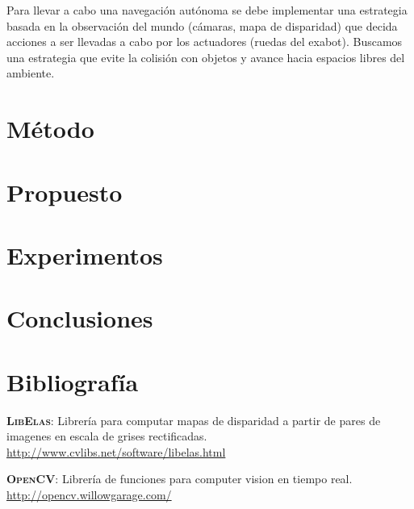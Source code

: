 \documentclass[journal,a4paper]{IEEEtran}
\newcommand{\tit}[1]{\textsc{\textbf{#1}}}
\begin{document}
Para llevar a cabo una navegación autónoma se debe implementar una estrategia basada en la observación del mundo (cámaras, mapa de disparidad) que decida acciones a ser llevadas a cabo por los actuadores (ruedas del exabot).
Buscamos una estrategia que evite la colisión con objetos y avance hacia espacios libres del ambiente.

\section{Método}

\section{Propuesto}

\section{Experimentos}

\section{Conclusiones}

\section{Bibliografía}

\tit{LibElas}: Librería para computar mapas de disparidad a partir de pares de imagenes en escala de grises rectificadas. \url{http://www.cvlibs.net/software/libelas.html}

\bigskip

\tit{OpenCV}: Librería de funciones para computer vision en tiempo real. \url{http://opencv.willowgarage.com/}
\end{document}
